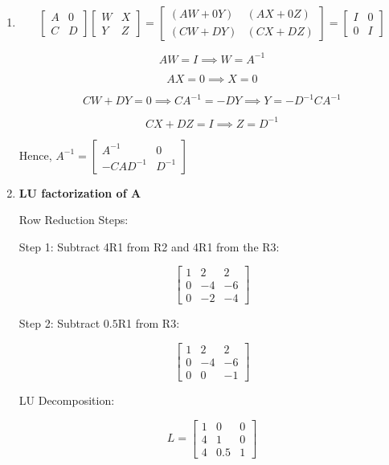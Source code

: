 \documentclass{article}
\begin{document}
\begin{enumerate}
    \item 
    \[
    \begin{bmatrix}
    A & 0 \\
    C & D
    \end{bmatrix}
    \begin{bmatrix}
    W & X \\
    Y & Z
    \end{bmatrix}
    =
    \begin{bmatrix}
    (AW + 0Y) & (AX + 0Z) \\
    (CW + DY) & (CX + DZ)
    \end{bmatrix}
    =
    \begin{bmatrix}
    I & 0 \\
    0 & I
    \end{bmatrix}
    \]
    
    \[
    AW = I \implies W = A^{-1}
    \]
    
    \[
    AX = 0 \implies X = 0
    \]
    
    \[
    CW + DY = 0 \implies CA^{-1} = -DY \implies Y = -D^{-1}CA^{-1}
    \]
    
    \[
    CX + DZ = I \implies Z = D^{-1}
    \]
    
    Hence, \(A^{-1} = \begin{bmatrix}
    A^{-1} & 0 \\
    -CAD^{-1} & D^{-1}
    \end{bmatrix}\)
    
    \item \textbf{LU factorization of A}

    Row Reduction Steps:

Step 1: Subtract 4R1 from R2 and 4R1 from the R3:

\[
\begin{bmatrix}
1 & 2 & 2 \\
0 & -4 & -6 \\
0 & -2 & -4
\end{bmatrix}
\]

Step 2: Subtract $0.5$R1 from R3:

\[
\begin{bmatrix}
1 & 2 & 2 \\
0 & -4 & -6 \\
0 & 0 & -1
\end{bmatrix}
\]

LU Decomposition:

\[
L = \begin{bmatrix}
1 & 0 & 0 \\
4 & 1 & 0 \\
4 & 0.5 & 1
\end{bmatrix}
\]


\end{enumerate}
\end{document}
